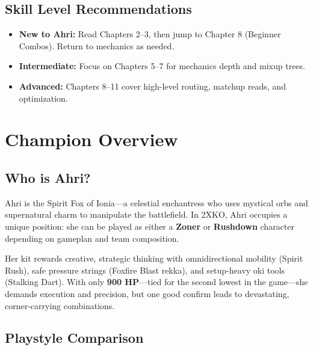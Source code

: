 \documentclass[12pt, a4paper]{report}
\newcommand{\faLightbulb}{\ding{72}}
\begin{document}
\section{Skill Level Recommendations}

\begin{tipbox}[title={\faLightbulb\enspace WHERE TO START}]
\begin{itemize}[itemsep=3pt]
  \item \textbf{New to Ahri:} Read Chapters 2--3, then jump to Chapter 8 (Beginner Combos). Return to mechanics as needed.
  \item \textbf{Intermediate:} Focus on Chapters 5--7 for mechanics depth and mixup trees.
  \item \textbf{Advanced:} Chapters 8--11 cover high-level routing, matchup reads, and optimization.
\end{itemize}
\end{tipbox}

\clearpage

\chapter{Champion Overview}

\section{Who is Ahri?}

Ahri is the Spirit Fox of Ionia---a celestial enchantress who uses mystical orbs and supernatural charm to manipulate the battlefield. In 2XKO, Ahri occupies a unique position: she can be played as either a \textbf{Zoner} or \textbf{Rushdown} character depending on gameplan and team composition.

Her kit rewards creative, strategic thinking with omnidirectional mobility (Spirit Rush), safe pressure strings (Foxfire Blast rekka), and setup-heavy oki tools (Stalking Dart). With only \textbf{900 HP}---tied for the second lowest in the game---she demands execution and precision, but one good confirm leads to devastating, corner-carrying combinations.

\section{Playstyle Comparison}
\end{document}
